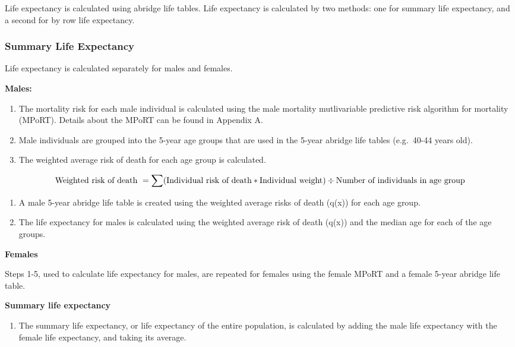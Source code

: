 \documentclass[]{book}
\providecommand{\tightlist}{%
  \setlength{\itemsep}{0pt}\setlength{\parskip}{0pt}}
\begin{document}
Life expectancy is calculated using abridge life tables. Life expectancy
is calculated by two methods: one for summary life expectancy, and a
second for by row life expectancy.

\subsubsection{Summary Life Expectancy}\label{summary-life-expectancy}

Life expectancy is calculated separately for males and females.

\textbf{Males:}

\begin{enumerate}
\def\labelenumi{\arabic{enumi}.}
\item
  The mortality risk for each male individual is calculated using the
  male mortality mutlivariable predictive risk algorithm for mortality
  (MPoRT). Details about the MPoRT can be found in Appendix A.
\item
  Male individuals are grouped into the 5-year age groups that are used
  in the 5-year abridge life tables (e.g.~40-44 years old).
\item
  The weighted average risk of death for each age group is calculated.
\end{enumerate}

\[ \text{Weighted risk of death } = \sum(\text{Individual risk of death}*\text{Individual weight}) \\ \div \text{Number of individuals in age group}\]

\begin{enumerate}
\def\labelenumi{\arabic{enumi}.}
\setcounter{enumi}{3}
\item
  A male 5-year abridge life table is created using the weighted average
  risks of death (q(x)) for each age group.
\item
  The life expectancy for males is calculated using the weighted average
  risk of death (q(x)) and the median age for each of the age groups.
\end{enumerate}

\textbf{Females}

Steps 1-5, used to calculate life expectancy for males, are repeated for
females using the female MPoRT and a female 5-year abridge life table.

\textbf{Summary life expectancy}

\begin{enumerate}
\def\labelenumi{\arabic{enumi}.}
\setcounter{enumi}{5}
\tightlist
\item
  The summary life expectancy, or life expectancy of the entire
  population, is calculated by adding the male life expectancy with the
  female life expectancy, and taking its average.
\end{enumerate}
\end{document}
